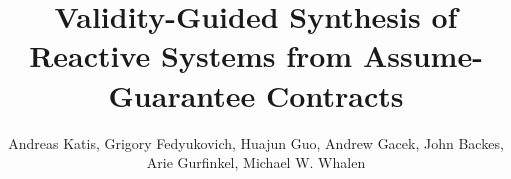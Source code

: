 \documentclass[10pt,conference]{llncs}
\begin{document}
\title{Validity-Guided Synthesis of Reactive Systems from Assume-Guarantee Contracts}

\author{Andreas Katis, Grigory Fedyukovich, Huajun Guo,
  Andrew Gacek, John Backes, Arie Gurfinkel, Michael
  W. Whalen}%




\maketitle
\end{document}
